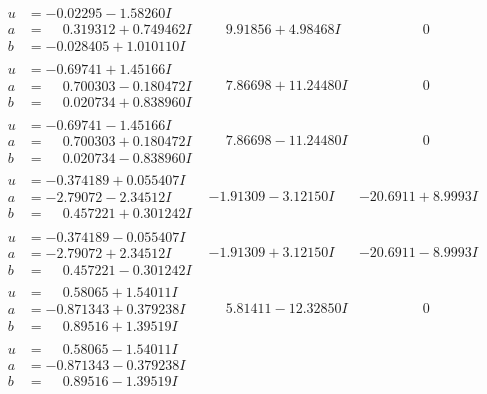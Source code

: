 \documentclass[1p]{elsarticle_modified}
\theoremstyle{definition}
\begin{document}
$$\begin{array}{c|c|c}
\begin{aligned}
u &= -0.02295 - 1.58260 I \\
a &= \phantom{-}0.319312 + 0.749462 I \\
b &= -0.028405 + 1.010110 I\end{aligned}
 & \phantom{-}9.91856 + 4.98468 I & \phantom{-0.000000 } 0 \\ \hline\begin{aligned}
u &= -0.69741 + 1.45166 I \\
a &= \phantom{-}0.700303 - 0.180472 I \\
b &= \phantom{-}0.020734 + 0.838960 I\end{aligned}
 & \phantom{-}7.86698 + 11.24480 I & \phantom{-0.000000 } 0 \\ \hline\begin{aligned}
u &= -0.69741 - 1.45166 I \\
a &= \phantom{-}0.700303 + 0.180472 I \\
b &= \phantom{-}0.020734 - 0.838960 I\end{aligned}
 & \phantom{-}7.86698 - 11.24480 I & \phantom{-0.000000 } 0 \\ \hline\begin{aligned}
u &= -0.374189 + 0.055407 I \\
a &= -2.79072 - 2.34512 I \\
b &= \phantom{-}0.457221 + 0.301242 I\end{aligned}
 & -1.91309 - 3.12150 I & -20.6911 + 8.9993 I \\ \hline\begin{aligned}
u &= -0.374189 - 0.055407 I \\
a &= -2.79072 + 2.34512 I \\
b &= \phantom{-}0.457221 - 0.301242 I\end{aligned}
 & -1.91309 + 3.12150 I & -20.6911 - 8.9993 I \\ \hline\begin{aligned}
u &= \phantom{-}0.58065 + 1.54011 I \\
a &= -0.871343 + 0.379238 I \\
b &= \phantom{-}0.89516 + 1.39519 I\end{aligned}
 & \phantom{-}5.81411 - 12.32850 I & \phantom{-0.000000 } 0 \\ \hline\begin{aligned}
u &= \phantom{-}0.58065 - 1.54011 I \\
a &= -0.871343 - 0.379238 I \\
b &= \phantom{-}0.89516 - 1.39519 I\end{aligned}

\end{array}$$
\end{document}
